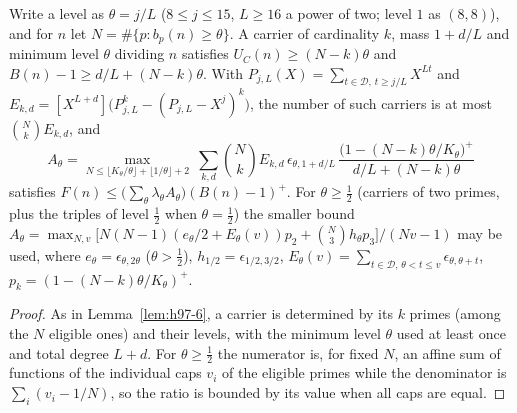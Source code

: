 \begin{lemma}\label{lem:h883-7}
Write a level as $\theta=j/L$ ($8\le j\le15$, $L\ge16$ a power of two; level $1$ as $(8,8)$), and for $n$ let
$N=\#\{p:b_p(n)\ge\theta\}$. A carrier of cardinality $k$, mass $1+d/L$ and minimum level $\theta$ dividing $n$
satisfies $U_C(n)\ge(N-k)\theta$ and $B(n)-1\ge d/L+(N-k)\theta$. With
$P_{j,L}(X)=\sum_{t\in\mathcal D,\,t\ge j/L}X^{Lt}$ and
$E_{k,d}=[X^{L+d}]\bigl(P_{j,L}^k-(P_{j,L}-X^j)^k\bigr)$, the number of such carriers is at most $\binom NkE_{k,d}$, and
\[
A_\theta=\max_{N\le\lfloor K_\theta/\theta\rfloor+\lfloor1/\theta\rfloor+2}\ \sum_{k,d}\binom Nk E_{k,d}\,
\epsilon_{\theta,1+d/L}\,\frac{\bigl(1-(N-k)\theta/K_\theta\bigr)^+}{d/L+(N-k)\theta}
\]
satisfies $F(n)\le\bigl(\sum_\theta\lambda_\theta A_\theta\bigr)(B(n)-1)^+$. For $\theta\ge\tfrac12$ (carriers of
two primes, plus the triples of level $\tfrac12$ when $\theta=\tfrac12$) the smaller bound
$A_\theta=\max_{N,v}\bigl[N(N-1)(e_\theta/2+E_\theta(v))p_2+\binom N3h_\theta p_3\bigr]/(Nv-1)$ may be used, where
$e_\theta=\epsilon_{\theta,2\theta}$ ($\theta>\tfrac12$), $h_{1/2}=\epsilon_{1/2,3/2}$,
$E_\theta(v)=\sum_{t\in\mathcal D,\,\theta<t\le v}\epsilon_{\theta,\theta+t}$, $p_k=(1-(N-k)\theta/K_\theta)^+$.
\end{lemma}
\begin{proof}
As in Lemma~\ref{lem:h97-6}, a carrier is determined by its $k$ primes (among the $N$ eligible ones) and their levels,
with the minimum level $\theta$ used at least once and total degree $L+d$. For $\theta\ge\tfrac12$ the numerator is,
for fixed $N$, an affine sum of functions of the individual caps $v_i$ of the eligible primes while the denominator is
$\sum_i(v_i-1/N)$, so the ratio is bounded by its value when all caps are equal.
\end{proof}

